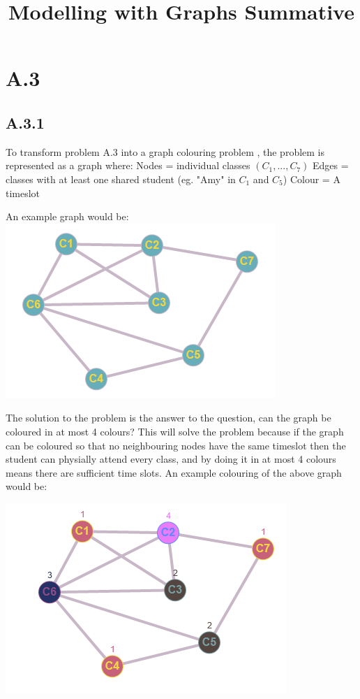 \documentclass{article}
\title{Modelling with Graphs Summative }
\begin{document}
\maketitle
\newpage
\section*{A.3}
\subsection*{A.3.1}
To transform problem A.3 into a graph colouring problem , the problem is represented as a graph where:
\newline
Nodes = individual classes $(C_1,..., C_7)$
\newline
Edges = classes with at least one shared student (eg. "Amy" in $C_1$ and $C_5$)
\newline
Colour = A timeslot
\newline
\begin{center}
An example graph would be:
\includegraphics{a31NC}
\newline
\end{center}
The solution to the problem is the answer to the question, can the graph be coloured in at most 4 colours?
\newline
This will solve the problem because if the graph can be coloured so that no neighbouring nodes have the same timeslot then the student can physially attend every class, and by doing it in at most 4 colours means there are sufficient time slots.
\newline
An example colouring of the above graph would be:
\begin{center}
\includegraphics{a31C}
\end{center}
\end{document}
